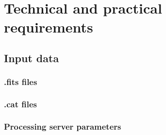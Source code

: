\chapter{Technical and practical requirements}\label{chap:requirements}


\section{Input data}\label{sec:input_data}
\subsection{.fits files}\label{sec:fits_files}
\subsection{.cat files}\label{sec:cat_files}
\subsection{Processing server parameters}\label{sec:server_param}